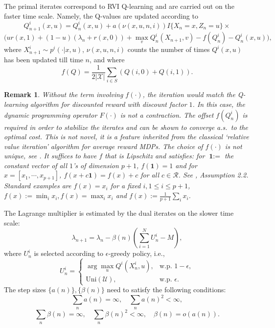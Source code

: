 \documentclass[12pt]{article}
\newtheorem{remark}[theorem]{Remark}
\numberwithin{equation}{section}
\newcommand{\R}{\mathcal{R}}
\newcommand{\1}{\textbf{1}}
\newcommand{\U}{\mathcal{U}}
\newcommand{\X}{\mathcal{X}}
\begin{document}
The primal iterates correspond to RVI Q-learning \cite{Abounadi} and are carried out on the faster time scale.
Namely, the Q-values are updated according to 
$$
Q_{n+1}^i(x,u)  =  Q^i_n(x,u) + a(\nu(x,u,n,i))I\{X_n = x, Z_n = u\}\times
$$
\begin{equation}
\label{QupdateA1}
\Big( u r(x,1) + (1-u) (\lambda_n + r(x,0)) + \max_{v}Q^i_n(X_{n+1},v)  - f(Q^i_n) -  Q^i_n(x,u)\Big),
\end{equation}
where $X^i_{n+1} \sim p^i(\cdot|x,u)$, $\nu(x,u,n,i)$ counts the number of times $Q^i(x,u)$ has been updated till time $n$, 
and where
\begin{equation}
f(Q) = \frac{1}{2 |\X|}\sum_{i\in S}(Q(i,0) + Q(i,1)). \label{eff}
\end{equation}
\begin{remark} Without the term involving $f(\cdot)$, the iteration would match the Q-learning algorithm for discounted reward with discount factor $1$. In this case, the dynamic programming operator $F(\cdot)$ is not a contraction. The offset $f(Q^i_n)$ is required in order to stabilize the iterates and can be shown to converge a.s.\ to the optimal cost. This is not novel, it is a feature inherited from the classical `relative value iteration' algorithm for average reward MDPs. The choice of $f(\cdot)$  is not unique, see \cite{Abounadi}. It suffices to have $f$ that is Lipschitz and satisfies: for $\1 :=$ the constant vector of all $1$'s of dimension $p+1$, $f(\1) = 1$ and for $x = [x_1, \cdots , x_{p+1}]$, $f(x + c\1) = f(x) + c$ for all $c \in \R$. See \cite{Abounadi}, Assumption 2.2. Standard examples are $f(x) = x_i$ for a fixed $i, 1 \leq i \leq p+1$, $f(x) := \min_ix_i, f(x) = \max_ix_i$ and $f(x) := \frac{1}{p+1}\sum_ix_i$.
\end{remark}  
The Lagrange multiplier is estimated by the dual iterates on the slower time scale:
\begin{equation}
\label{lambdaupdateA1}
\lambda_{n+1} = \lambda_n - \beta(n) \left(\sum_{i=1}^{N} U^i_n-M\right),
\end{equation}
where $U^i_n$ is selected according to $\epsilon$-greedy policy, i.e.,
\begin{equation}
\label{eps-greedy}
U^i_n = \left\{ \begin{array}{ll}
\arg \max_u Q^i(X^i_n,u), & \mbox{w.p. \ } 1-\epsilon,\\
\mbox{Uni}(\U), & \mbox{w.p. \ } \epsilon.
\end{array} \right.
\end{equation}
The step sizes $\{a(n)\}, \{\beta(n)\}$ need to satisfy the following conditions:
$$
\sum_n a(n) = \infty, \quad \sum_n a(n)^2 < \infty,
$$
\begin{equation}
\label{timesteps}
\sum_n \beta(n) = \infty, \quad \sum_n \beta(n)^2 < \infty, \quad \beta(n) = o(a(n)).
\end{equation}
\end{document}
